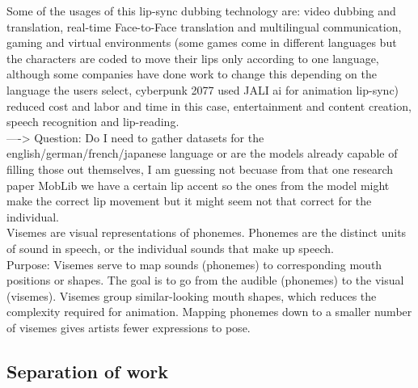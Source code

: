 \documentclass[12pt]{article}
\begin{document}
Some of the usages of this lip-sync dubbing technology are: video dubbing and translation, real-time Face-to-Face translation and multilingual communication, gaming and virtual environments (some games come in different languages but the characters are coded to move their lips only according to one language, although some companies have done work to change this depending on the language the users select, cyberpunk 2077 used JALI ai for animation lip-sync) reduced cost and labor and time in this case, entertainment and content creation, speech recognition and lip-reading.\\
----> Question: Do I need to gather datasets for the english/german/french/japanese language or are the models already capable of filling those out themselves, I am guessing not becuase from that one research paper MobLib we have a certain lip accent so the ones from the model might make the correct lip movement but it might seem not that correct for the individual.\\
Visemes are visual representations of phonemes. Phonemes are the distinct units of sound in speech, or the individual sounds that make up speech.\\
Purpose: Visemes serve to map sounds (phonemes) to corresponding mouth positions or shapes. The goal is to go from the audible (phonemes) to the visual (visemes). Visemes group similar-looking mouth shapes, which reduces the complexity required for animation. Mapping phonemes down to a smaller number of visemes gives artists fewer expressions to pose.


\subsection{Separation of work}
\end{document}
